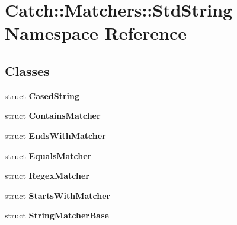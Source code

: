 \section{Catch\+::Matchers\+::Std\+String Namespace Reference}
\label{namespace_catch_1_1_matchers_1_1_std_string}
\subsection*{Classes}
\begin{DoxyCompactItemize}
\item 
struct \textbf{ Cased\+String}
\item 
struct \textbf{ Contains\+Matcher}
\item 
struct \textbf{ Ends\+With\+Matcher}
\item 
struct \textbf{ Equals\+Matcher}
\item 
struct \textbf{ Regex\+Matcher}
\item 
struct \textbf{ Starts\+With\+Matcher}
\item 
struct \textbf{ String\+Matcher\+Base}
\end{DoxyCompactItemize}
